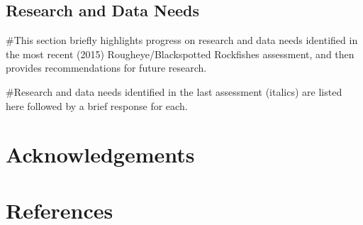 \documentclass[
]{scrartcl}
\begin{document}
\subsection{Research and Data Needs}\label{research-and-data-needs-1}

\#This section briefly highlights progress on research and data needs
identified in the most recent (2015) Rougheye/Blackspotted Rockfishes
assessment, and then provides recommendations for future research.

\#Research and data needs identified in the last assessment (italics)
are listed here followed by a brief response for each.

\newpage{}

\section{Acknowledgements}\label{sec-acknowledgements}

\newpage{}

\section{References}\label{references}
\end{document}
